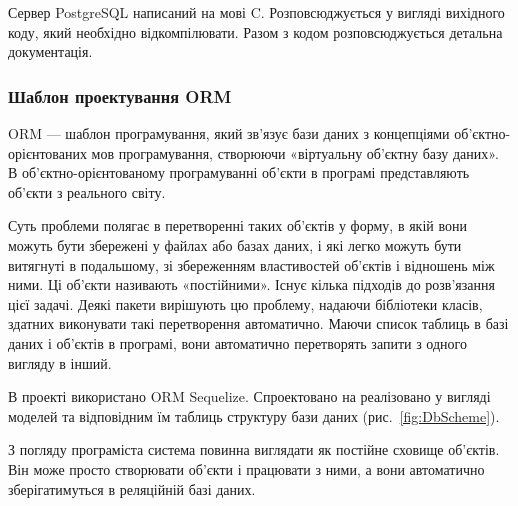 Сервер PostgreSQL написаний на мові C. Розповсюджується у вигляді вихідного коду, який необхідно відкомпілювати. Разом з кодом розповсюджується детальна документація.

\subsubsection{Шаблон проектування ORM} \label{subs:orm}

ORM — шаблон програмування, який зв'язує бази даних з концепціями об'єктно-орієнтованих мов програмування, створюючи «віртуальну об'єктну базу даних». В об'єктно-орієнтованому програмуванні об'єкти в програмі представляють об'єкти з реального світу. 

Суть проблеми полягає в перетворенні таких об'єктів у форму, в якій вони можуть бути збережені у файлах або базах даних, і які легко можуть бути витягнуті в подальшому, зі збереженням властивостей об'єктів і відношень між ними. Ці об'єкти називають «постійними». Існує кілька підходів до розв'язання цієї задачі. Деякі пакети вирішують цю проблему, надаючи бібліотеки класів, здатних виконувати такі перетворення автоматично. Маючи список таблиць в базі даних і об'єктів в програмі, вони автоматично перетворять запити з одного вигляду в інший.

В проекті використано ORM Sequelize. Спроектовано на реалізовано у вигляді моделей та відповідним їм таблиць структуру бази даних (рис.~\ref{fig:DbScheme}).


З погляду програміста система повинна виглядати як постійне сховище об'єктів. Він може просто створювати об'єкти і працювати з ними, а вони автоматично зберігатимуться в реляційній базі даних.
